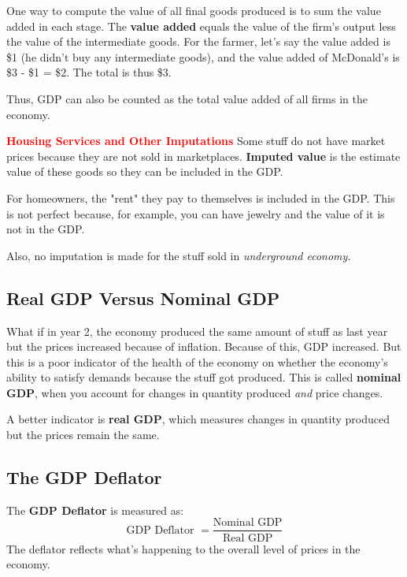 \documentclass[12pt]{article}
\newcommand{\leadwords}[2]{\textcolor{red}{\textbf{\large #1}} #2}
\begin{document}
One way to compute the value of all final goods produced is to sum the value added in each stage. The \textbf{value added} equals the value of the firm's output less the value of the intermediate goods. For the farmer, let's say the value added is \$1 (he didn't buy any intermediate goods), and the value added of McDonald's is \$3 - \$1 = \$2. The total is thus \$3.

Thus, GDP can also be counted as the total value added of all firms in the economy.

\leadwords{Housing Services and Other Imputations} Some stuff do not have market prices because they are not sold in marketplaces. \textbf{Imputed value} is the estimate value of these goods so they can be included in the GDP.

For homeowners, the "rent" they pay to themselves is included in the GDP. This is not perfect because, for example, you can have jewelry and the value of it is not in the GDP.

Also, no imputation is made for the stuff sold in \textit{underground economy}.

\subsection{Real GDP Versus Nominal GDP}

What if in year 2, the economy produced the same amount of stuff as last year but the prices increased because of inflation. Because of this, GDP increased. But this is a poor indicator of the health of the economy on whether the economy's ability to satisfy demands because the stuff got produced. This is called \textbf{nominal GDP}, when you account for changes in quantity produced \textit{and} price changes.

A better indicator is \textbf{real GDP}, which measures changes in quantity produced but the prices remain the same.


\subsection{The GDP Deflator}

The \textbf{GDP Deflator} is measured as: $$\text{GDP Deflator } = \frac{\text{Nominal GDP}}{\text{Real GDP}}$$
The deflator reflects what's happening to the overall level of prices in the economy.
\end{document}
